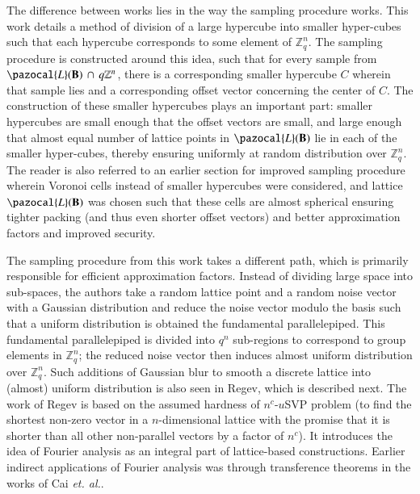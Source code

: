 \documentclass[10pt]{elsarticle}
\begin{document}
The difference between works lies in the way the sampling procedure
works. This work details a method of division of a large hypercube
into smaller hyper-cubes such that each hypercube corresponds to
some element of $\mathbb{Z}_{q}^{n}$. The sampling procedure is
constructed around this idea, such that for every sample from
$\pazocal{L}(\mathbf{B}) \, \cap\, q\mathbb{Z}^{n}$, there is a
corresponding smaller hypercube $C$ wherein that sample lies and a
corresponding offset vector concerning the center of $C$. The
construction of these smaller hypercubes plays an important part:
smaller hypercubes are small enough that the offset vectors are
small, and large enough that almost equal number of lattice points
in $\pazocal{L}(\mathbf{B})$ lie in each of the smaller hyper-cubes,
thereby ensuring uniformly at random distribution over
$\mathbb{Z}_{q}^{n}$. The reader is also referred to an earlier
section for improved sampling procedure wherein Voronoi cells
instead of smaller hypercubes were considered, and lattice
$\pazocal{L}(\mathbf{B})$ was chosen such that these cells are
almost spherical ensuring tighter packing (and thus even shorter
offset vectors) and better approximation factors and improved
security.

The sampling procedure from this work takes a different path, which
is primarily responsible for efficient approximation factors.
Instead of dividing large space into sub-spaces, the authors take a
random lattice point and a random noise vector with a Gaussian
distribution and reduce the noise vector modulo the basis such that
a uniform distribution is obtained the fundamental parallelepiped.
This fundamental parallelepiped is divided into $q^{n}$ sub-regions
to correspond to group elements in $\mathbb{Z}_{q}^{n}$; the reduced
noise vector then induces almost uniform distribution over
$\mathbb{Z}_{q}^{n}$. Such additions of Gaussian blur to smooth a
discrete lattice into (almost) uniform distribution is also seen in
Regev\cite{CRHF_Regev}, which is described next. The work of
Regev\cite{CRHF_Regev} is based on the assumed hardness of
$n^{c}$-$u$SVP problem (to find the shortest non-zero vector in a
$n$-dimensional lattice with the promise that it is shorter than all
other non-parallel vectors by a factor of $n^{c}$). It introduces
the idea of Fourier analysis as an integral part of lattice-based
constructions. Earlier indirect applications of Fourier analysis was
through transference theorems in the works of Cai \textit{et.
al.}\cite{CRHF_Cai1999}.
\end{document}
